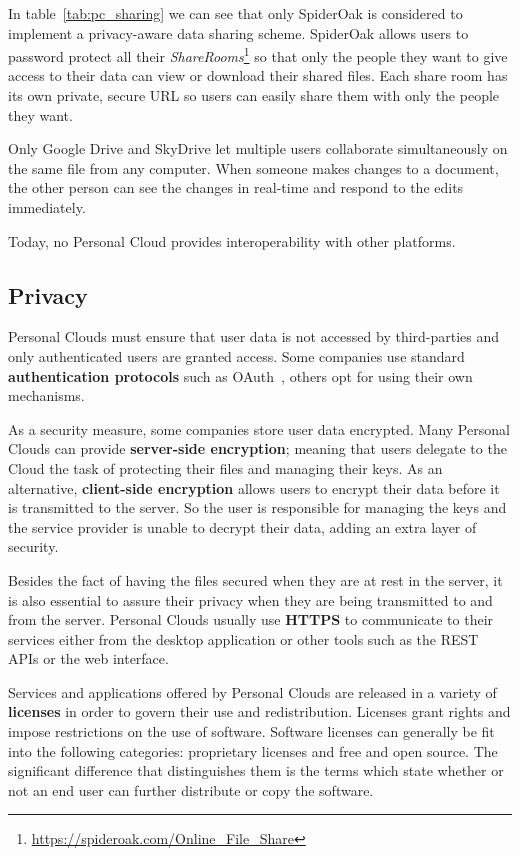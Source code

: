 In table~\ref{tab:pc_sharing} we can see that only SpiderOak is considered to implement a privacy-aware data sharing scheme. SpiderOak allows users to password protect all their \textit{ShareRooms}\footnote{\url{https://spideroak.com/Online_File_Share}} so that only the people they want to give access to their data can view or download their shared files. Each share room has its own private, secure URL so users can easily share them with only the people they want.


Only Google Drive and SkyDrive let multiple users collaborate simultaneously on the same file from any computer. When someone makes changes to a document, the other person can see the changes in real-time and respond to the edits immediately.

Today, no Personal Cloud provides interoperability with other platforms.


\subsection{Privacy}


Personal Clouds must ensure that user data is not accessed by third-parties and only authenticated users are granted access. Some companies use standard \textbf{authentication protocols} such as OAuth~\cite{oauth}, others opt for using their own mechanisms.

As a security measure, some companies store user data encrypted. Many Personal Clouds can provide \textbf{server-side encryption}; meaning that users delegate to the Cloud the task of protecting their files and managing their keys. As an alternative, \textbf{client-side encryption} allows users to encrypt their data before it is transmitted to the server. So the user is responsible for managing the keys and the service provider is unable to decrypt their data, adding an extra layer of security.

Besides the fact of having the files secured when they are at rest in the server, it is also essential to assure their privacy when they are being transmitted to and from the server. Personal Clouds usually use \textbf{HTTPS} to communicate to their services either from the desktop application or other tools such as the REST APIs or the web interface.

Services and applications offered by Personal Clouds are released in a variety of \textbf{licenses} in order to govern their use and redistribution. Licenses grant rights and impose restrictions on the use of software. Software licenses can generally be fit into the following categories: proprietary licenses and free and open source. The significant difference that distinguishes them is the terms which state whether or not an end user can further distribute or copy the software.



